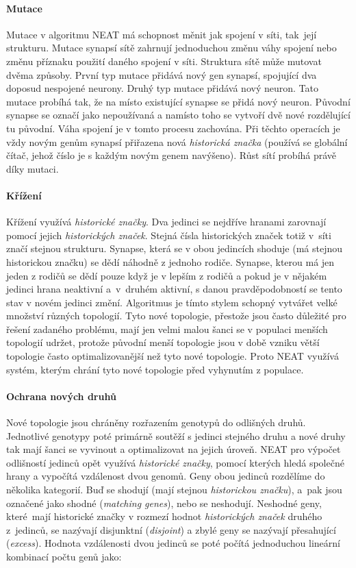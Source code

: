\paragraph{Mutace}
Mutace v algoritmu NEAT má schopnost měnit jak spojení v síti, tak~její
strukturu. Mutace synapsí sítě zahrnují jednoduchou změnu váhy spojení nebo
změnu příznaku použití daného spojení v síti. Struktura sítě může mutovat dvěma
způsoby. První typ mutace přidává nový gen synapsí, spojující dva doposud
nespojené neurony. Druhý typ mutace přidává nový neuron. Tato mutace probíhá
tak, že na místo existující synapse se přidá nový neuron. Původní synapse se
označí jako nepoužívaná a namísto toho se vytvoří dvě nové rozdělující tu
původní. Váha spojení je v tomto procesu zachována. Při těchto operacích je
vždy novým genům synapsí přiřazena nová \emph{historická značka} (používá se
globální čítač, jehož číslo je s každým novým genem navýšeno). Růst sítí
probíhá právě díky mutaci.

\paragraph{Křížení}
Křížení využívá \emph{historické značky}. Dva jedinci se nejdříve hranami
zarovnají pomocí jejich \emph{historických značek}. Stejná čísla historických
značek totiž v~síti značí stejnou strukturu. Synapse, která se v obou jedincích
shoduje (má stejnou historickou značku) se dědí náhodně z jednoho rodiče.
Synapse, kterou má jen jeden z rodičů se dědí pouze když je v lepším z rodičů a
pokud je v nějakém jedinci hrana neaktivní a~v~druhém aktivní, s danou
pravděpodobností se tento stav v novém jedinci změní. Algoritmus je tímto
stylem schopný vytvářet velké množství různých topologií. Tyto nové topologie,
přestože jsou často důležité pro řešení zadaného problému, mají jen velmi malou
šanci se v populaci menších topologií udržet, protože původní menší topologie
jsou v době vzniku větší topologie často optimalizovanější než tyto nové
topologie. Proto NEAT využívá systém, kterým chrání tyto nové topologie před
vyhynutím z populace.

\paragraph{Ochrana nových druhů}
Nové topologie jsou chráněny rozřazením genotypů do odlišných druhů. Jednotlivé
genotypy poté primárně soutěží s jedinci stejného druhu a nové druhy tak mají
šanci se vyvinout a optimalizovat na jejich úroveň. NEAT pro výpočet odlišností
jedinců opět využívá \emph{historické značky}, pomocí kterých hledá společné
hrany a vypočítá vzdálenost dvou genomů. Geny obou jedinců rozdělíme do
několika kategorií. Buď se shodují (mají stejnou \emph{historickou značku}),
a~pak jsou označené jako shodné (\emph{matching genes}), nebo se neshodují.
Neshodné geny, které~mají historické značky v rozmezí hodnot \emph{historických
značek} druhého z~jedinců, se nazývají disjunktní (\emph{disjoint}) a zbylé
geny se nazývají přesahující (\emph{excess}). Hodnota vzdálenosti dvou jedinců
se poté počítá jednoduchou lineární kombinací počtu genů jako:

